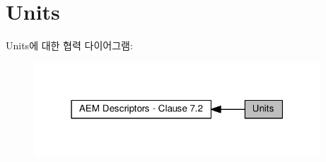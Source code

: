 \hypertarget{group__units}{}\section{Units}
\label{group__units}
Units에 대한 협력 다이어그램\+:
\nopagebreak
\begin{figure}[H]
\begin{center}
\leavevmode
\includegraphics[width=304pt]{group__units}
\end{center}
\end{figure}
